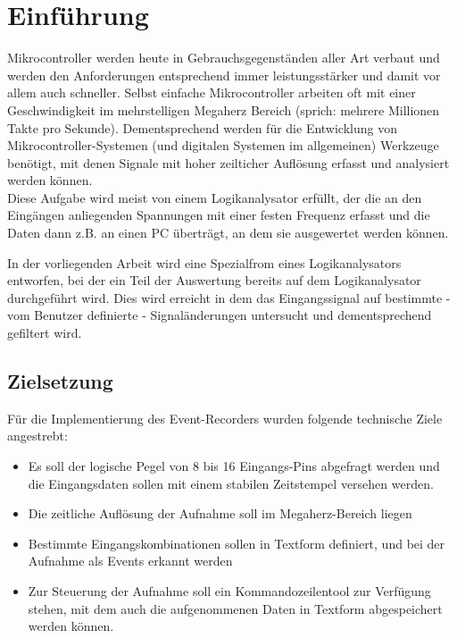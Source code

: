 \chapter{Einführung}

\label{ch:Einfuehrung}

Mikrocontroller werden heute in Gebrauchsgegenständen aller Art verbaut und werden den Anforderungen entsprechend immer leistungsstärker und damit vor allem auch schneller. Selbst einfache Mikrocontroller arbeiten oft mit einer Geschwindigkeit im mehrstelligen Megaherz Bereich (sprich: mehrere Millionen Takte pro Sekunde). Dementsprechend werden für die Entwicklung von Mikrocontroller-Systemen (und digitalen Systemen im allgemeinen) Werkzeuge benötigt, mit denen Signale mit hoher zeilticher Auflösung erfasst und analysiert werden können.\\

Diese Aufgabe wird meist von einem Logikanalysator erfüllt, der die an den Eingängen anliegenden Spannungen mit einer festen Frequenz erfasst und die Daten dann z.B. an einen PC überträgt, an dem sie ausgewertet werden können.\
 
In der vorliegenden Arbeit wird eine Spezialfrom eines Logikanalysators entworfen, bei der ein Teil der Auswertung bereits auf dem Logikanalysator durchgeführt wird. Dies wird erreicht in dem das Eingangssignal auf bestimmte - vom Benutzer definierte - Signaländerungen untersucht und dementsprechend gefiltert wird.       


\section{Zielsetzung}
\label{ch:Einfuehrung:Zielsetzung}

Für die Implementierung des Event-Recorders wurden folgende technische Ziele angestrebt:
\begin{itemize}
\item Es soll der logische Pegel von 8 bis 16 Eingangs-Pins abgefragt werden und die Eingangsdaten sollen mit einem stabilen Zeitstempel versehen werden.
\item Die zeitliche Auflösung der Aufnahme soll im Megaherz-Bereich liegen
\item Bestimmte Eingangskombinationen sollen in Textform definiert, und bei der Aufnahme als Events erkannt werden
\item Zur Steuerung der Aufnahme soll ein Kommandozeilentool zur Verfügung stehen, mit dem auch die aufgenommenen Daten in Textform abgespeichert werden können.
\end{itemize} 


